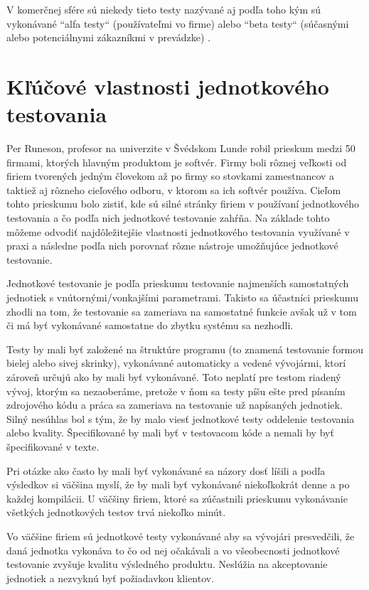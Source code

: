 \documentclass[11pt,twoside,slovak,a4paper]{article}
\begin{document}
			V komerčnej sfére sú niekedy tieto testy nazývané aj podľa toho kým sú vykonávané ``alfa testy`` (používateľmi vo firme) alebo ``beta testy`` (súčasnými alebo potenciálnymi zákazníkmi v prevádzke) \cite{Alba2008}.
	
	\newpage
	\thispagestyle{plain}
	\section{Kľúčové vlastnosti jednotkového testovania}
	
	Per Runeson, profesor na univerzite v Švédskom Lunde robil prieskum medzi 50 firmami, ktorých hlavným produktom je softvér\cite{Runeson2006}. Firmy boli rôznej veľkosti od firiem tvorených jedným človekom až po firmy so stovkami zamestnancov a taktiež aj rôzneho cieľového odboru, v ktorom sa ich softvér používa. Cieľom tohto prieskumu bolo zistiť, kde sú silné stránky firiem v používaní jednotkového testovania a čo podľa nich jednotkové testovanie zahŕňa. Na základe tohto môžeme odvodiť najdôležitejšie vlastnosti jednotkového testovania využívané v praxi a následne podľa nich porovnať rôzne nástroje umožňujúce jednotkové testovanie.
	
	Jednotkové testovanie je podľa prieskumu testovanie najmenších samostatných jednotiek s vnútornými/vonkajšími parametrami. Takisto sa účastníci prieskumu zhodli na tom, že testovanie sa zameriava na samostatné funkcie avšak už v tom či má byť vykonávané samostatne do zbytku systému sa nezhodli.
	
	Testy by mali byť založené na štruktúre programu (to znamená testovanie formou bielej alebo sivej skrinky), vykonávané automaticky a vedené vývojármi, ktorí zároveň určujú ako by mali byť vykonávané. Toto neplatí pre testom riadený vývoj, ktorým sa nezaoberáme, pretože v ňom sa testy píšu ešte pred písaním zdrojového kódu a práca sa zameriava na testovanie už napísaných jednotiek. Silný nesúhlas bol s tým, že by malo viesť jednotkové testy oddelenie testovania alebo kvality. Špecifikované by mali byť v testovacom kóde a nemali by byť špecifikované v texte.
	
	Pri otázke ako často by mali byť vykonávané sa názory dosť líšili a podľa výsledkov si väčšina myslí, že by mali byť vykonávané niekoľkokrát denne a po každej kompilácii. U väčšiny firiem, ktoré sa zúčastnili prieskumu vykonávanie všetkých jednotkových testov trvá niekoľko minút.
	
	Vo väčšine firiem sú jednotkové testy vykonávané aby sa vývojári presvedčili, že daná jednotka vykonáva to čo od nej očakávali a vo všeobecnosti jednotkové testovanie zvyšuje kvalitu výsledného produktu. Neslúžia na akceptovanie jednotiek a nezvyknú byť požiadavkou klientov.
	
\end{document}
